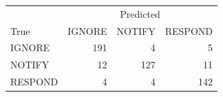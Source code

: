 \begin{tabular}{lrrr}
\toprule
 & \multicolumn{3}{c}{Predicted} \\
True & IGNORE & NOTIFY & RESPOND \\
\midrule
IGNORE & 191 & 4 & 5 \\
NOTIFY & 12 & 127 & 11 \\
RESPOND & 4 & 4 & 142 \\
\bottomrule
\end{tabular}
